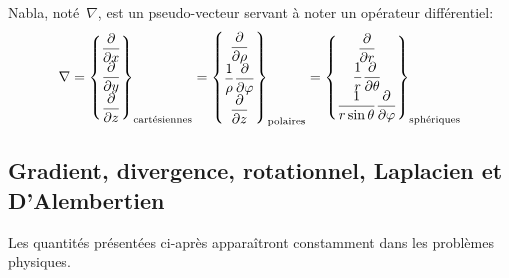 \medskip
{} Nabla, noté~$\nabla$, est un pseudo-vecteur  servant à noter un opérateur différentiel:
\begin{equation}
\nabla = \VV*{{\dfrac\partial{\partial x}}\\ \dfrac\partial{\partial y}\\ \dfrac\partial{\partial z}}_{\text{cartésiennes}}
= \VV*{\dfrac\partial{\partial \rho}\\ \dfrac1\rho \dfrac\partial{\partial \varphi}\\ \dfrac\partial{\partial z}}_{\text{polaires}}
= \VV*{\dfrac\partial{\partial r}\\ \dfrac1r \dfrac\partial{\partial \theta}\\\dfrac1{r\sin\theta} \dfrac\partial{\partial \varphi}}_{\text{sphériques}}
\end{equation}

\medskip
\subsection{Gradient, divergence, rotationnel, Laplacien et D'Alembertien}

Les quantités présentées ci-après apparaîtront constamment dans les problèmes physiques.%

